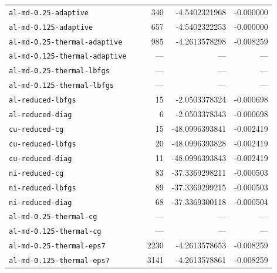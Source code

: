 \begin{longtable}{p{0.53\linewidth}rrr}
\nolinkurl{al-md-0.25-adaptive} & 340 & -4.5402321968 & -0.000000\\
\nolinkurl{al-md-0.125-adaptive} & 657 & -4.5402322253 & -0.000000\\
\nolinkurl{al-md-0.25-thermal-adaptive} & 985 & -4.2613578298 & -0.008259\\
\nolinkurl{al-md-0.125-thermal-adaptive} & --- & --- & ---\\
\nolinkurl{al-md-0.25-thermal-lbfgs} & --- & --- & ---\\
\nolinkurl{al-md-0.125-thermal-lbfgs} & --- & --- & ---\\
\nolinkurl{al-reduced-lbfgs} & 15 & -2.0503378324 & -0.000698\\
\nolinkurl{al-reduced-diag} & 6 & -2.0503378343 & -0.000698\\
\nolinkurl{cu-reduced-cg} & 15 & -48.0996393841 & -0.002419\\
\nolinkurl{cu-reduced-lbfgs} & 20 & -48.0996393828 & -0.002419\\
\nolinkurl{cu-reduced-diag} & 11 & -48.0996393843 & -0.002419\\
\nolinkurl{ni-reduced-cg} & 83 & -37.3369298211 & -0.000503\\
\nolinkurl{ni-reduced-lbfgs} & 89 & -37.3369299215 & -0.000503\\
\nolinkurl{ni-reduced-diag} & 68 & -37.3369300118 & -0.000504\\
\nolinkurl{al-md-0.25-thermal-cg} & --- & --- & ---\\
\nolinkurl{al-md-0.125-thermal-cg} & --- & --- & ---\\
\nolinkurl{al-md-0.25-thermal-eps7} & 2230 & -4.2613578653 & -0.008259\\
\nolinkurl{al-md-0.125-thermal-eps7} & 3141 & -4.2613578861 & -0.008259\\
\bottomrule\end{longtable}
